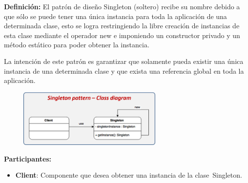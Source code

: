 \documentclass[12pt]{article}
\begin{document}
\begin{multicols}{2}
\begin{enumerate}
\begin{itemize}
\vspace{\baselineskip}
{\fontsize{9pt}{10.8pt}\selectfont \textbf{Definición:} El patrón de diseño Singleton (soltero) recibe su nombre debido a que sólo se puede tener una única instancia para toda la aplicación de una determinada clase, esto se logra restringiendo la libre creación de instancias de esta clase mediante el operador new e imponiendo un constructor privado y un método estático para poder obtener la instancia. \par}\par


\vspace{\baselineskip}
{\fontsize{9pt}{10.8pt}\selectfont La intención de este patrón es garantizar que solamente pueda existir una única instancia de una determinada clase y que exista una referencia global en toda la aplicación.\par}\par


\vspace{\baselineskip}



\begin{figure}[H]
	\begin{Center}
		\includegraphics[width=2.81in,height=1.13in]{./media/image7.png}
	\end{Center}
\end{figure}



\par

{\fontsize{9pt}{10.8pt}\selectfont \textbf{Participantes:} \par}\par

\begin{itemize}
	\item {\fontsize{9pt}{10.8pt}\selectfont \textbf{Client}: Componente que desea obtener una instancia de la clase Singleton. \par}\par


\end{itemize}
\end{itemize}
\end{enumerate}
\end{multicols}
\end{document}
